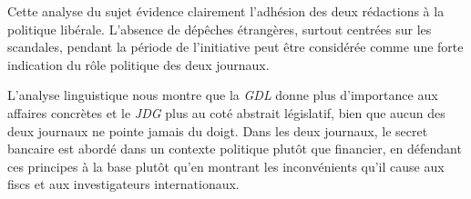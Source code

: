 \documentclass[a4paper, 11pt]{article}
\begin{document}
Cette analyse du sujet évidence clairement l'adhésion des deux
rédactions à la politique libérale. L'absence de dépêches étrangères,
surtout centrées sur les scandales, pendant la période de l'initiative
peut être considérée comme une forte indication du rôle politique des
deux journaux.

L'analyse linguistique nous montre que la \emph{GDL} donne plus
d'importance aux affaires concrètes et le \emph{JDG} plus au coté
abstrait législatif, bien que aucun des deux journaux ne pointe jamais
du doigt. Dans les deux journaux, le secret bancaire est abordé dans un
contexte politique plutôt que financier, en défendant ces principes à la
base plutôt qu'en montrant les inconvénients qu'il cause aux fiscs et
aux investigateurs internationaux.



\newpage



\end{document}
